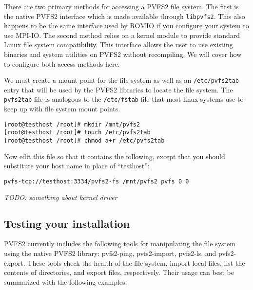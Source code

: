 \documentclass[11pt, letterpaper]{article}
\begin{document}
There are two primary methods for accessing a PVFS2 file system.  The
first is the native PVFS2 interface which is made available
through {\tt libpvfs2}.  This also happens to be the same interface used by
ROMIO if you configure your system to use MPI-IO.  The second method
relies on a kernel module to provide standard Linux file system
compatibility.  This interface allows the user to use existing
binaries and system utilities on PVFS2 without recompiling.  We will
cover how to configure both access methods here.

We must create a mount point for the file system as well as
an {\tt /etc/pvfs2tab} entry that will be used by
the PVFS2 libraries to locate the file system.  The {\tt pvfs2tab} file is
analogous to the {\tt /etc/fstab} file that most linux systems use to keep up
with file system mount points.

\begin{verbatim}
[root@testhost /root]# mkdir /mnt/pvfs2
[root@testhost /root]# touch /etc/pvfs2tab
[root@testhost /root]# chmod a+r /etc/pvfs2tab
\end{verbatim}

Now edit this file so that it contains the following, except that you should
substitute your host name in place of ``testhost'':

\begin{verbatim}
pvfs-tcp://testhost:3334/pvfs2-fs /mnt/pvfs2 pvfs 0 0 
\end{verbatim}


\emph{TODO: something about kernel driver}

\subsection{Testing your installation}

PVFS2 currently includes the following tools for manipulating the file system
using the native PVFS2 library: pvfs2-ping, pvfs2-import, pvfs2-ls, and pvfs2-export.  These tools check the health of the file system, import local files, 
list the contents of directories, and export files, respectively.  Their usage 
can best be summarized with the following examples:
\end{document}
